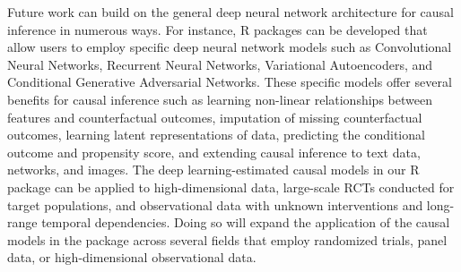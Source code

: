 Future work can build on the general deep neural network architecture
for causal inference in numerous ways. For instance, R packages can be
developed that allow users to employ specific deep neural network models
such as Convolutional Neural Networks, Recurrent Neural Networks,
Variational Autoencoders, and Conditional Generative Adversarial
Networks. These specific models offer several benefits for causal
inference such as learning non-linear relationships between features and
counterfactual outcomes, imputation of missing counterfactual outcomes,
learning latent representations of data, predicting the conditional
outcome and propensity score, and extending causal inference to text
data, networks, and images. The deep learning-estimated causal models in
our R package can be applied to high-dimensional data, large-scale RCTs
conducted for target populations, and observational data with unknown
interventions and long-range temporal dependencies. Doing so will expand
the application of the causal models in the package across several
fields that employ randomized trials, panel data, or high-dimensional
observational data.



\address{%
Nguyen Khoi Huynh\\
Hitotsubashi Institute for Advanced StudyHitotsubashi University\\%
Kunitachi, Tokyo, Japan\\
%
%
\textit{ORCiD: \href{https://orcid.org/0000-0002-6234-7232}{0000-0002-6234-7232}}\\%
\href{mailto:khoinguyen.huynh@r.hit-u.ac.jp}{\nolinkurl{khoinguyen.huynh@r.hit-u.ac.jp}}%
}

\address{%
Yang Yang\\
Department of Political ScienceThe Pennsylvania State University\\%
University Park, PA, USA\\
%
%
\textit{ORCiD: \href{https://orcid.org/0009-0004-6135-4555}{0009-0004-6135-4555}}\\%
\href{mailto:yky5272@psu.edu}{\nolinkurl{yky5272@psu.edu}}%
}

\address{%
Bumba Mukherjee\\
Department of Political ScienceThe Pennsylvania State University\\%
University Park, PA, USA\\
%
%
\textit{ORCiD: \href{https://orcid.org/0000-0002-3453-601X}{0000-0002-3453-601X}}\\%
\href{mailto:bumba.mukherjee@psu.edu}{\nolinkurl{bumba.mukherjee@psu.edu}}%
}
